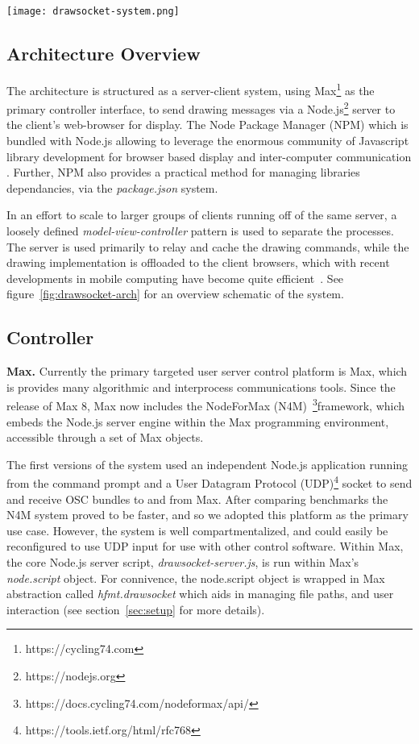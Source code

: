 \begin{figure*}[]
\centering
\texttt{[image: drawsocket-system.png]}
\caption{\drawsocket Sever/Client Architecture. 
\label{fig:drawsocket-arch}}
\end{figure*}

\subsection{Architecture Overview}
The \drawsocket architecture is structured as a server-client system, using Max\footnote{https://cycling74.com}  as the primary controller interface, to send drawing messages via a Node.js\footnote{https://nodejs.org} server to the client's web-browser for display. 
The Node Package Manager (NPM) which is bundled with Node.js allowing \drawsocket to leverage the enormous community of Javascript library development for browser based display and inter-computer communication \cite{trockman2018adding}. 
Further, NPM also provides a practical method for managing libraries dependancies, via the \textit{package.json} system.

In an effort to scale to larger groups of clients running off of the same server, a loosely defined \textit{model-view-controller} \cite{krasner1988description} pattern is used to separate the processes. 
The server is used primarily to relay and cache the drawing commands, while the drawing implementation is offloaded to the client browsers, which with recent developments in mobile computing have become quite efficient~\cite{halpern2016mobile}.
See figure~\ref{fig:drawsocket-arch} for an overview schematic of the system. 

\subsection{Controller}
\noindent
\textbf{Max.}
Currently the primary targeted user server control platform is Max, which is provides many algorithmic and interprocess communications tools. 
Since the release of Max 8, Max now includes the NodeForMax (N4M)~\footnote{https://docs.cycling74.com/nodeformax/api/}framework, which embeds the Node.js server engine within the Max programming environment, accessible through a set of Max objects.

The first versions of the \drawsocket system used an independent Node.js application running from the command prompt and a User Datagram Protocol (UDP)\footnote{https://tools.ietf.org/html/rfc768}  socket to send and receive OSC bundles to and from Max.
After comparing benchmarks the N4M system proved to be faster, and so we adopted this platform as the primary use case.
However, the \drawsocket system is well compartmentalized, and could easily be reconfigured to use UDP input for use with other control software.
Within Max, the core Node.js server script, \textit{drawsocket-server.js}, is run within Max's \textit{node.script} object. For connivence, the node.script object is wrapped in Max abstraction called \textit{hfmt.drawsocket} which aids in managing file paths, and user interaction (see section~\ref{sec:setup} for more details).

